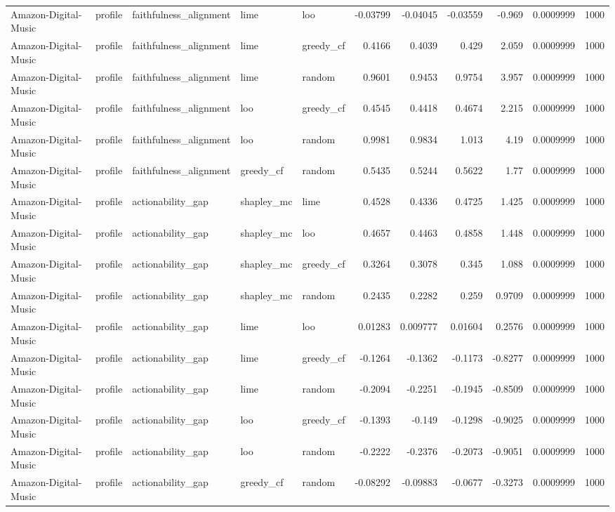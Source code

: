 \begin{table}[t]
\begin{tabular}{lllllrrrrrr}
Amazon-Digital-Music & profile & faithfulness\_alignment & lime & loo & -0.03799 & -0.04045 & -0.03559 & -0.969 & 0.0009999 & 1000 \\
Amazon-Digital-Music & profile & faithfulness\_alignment & lime & greedy\_cf & 0.4166 & 0.4039 & 0.429 & 2.059 & 0.0009999 & 1000 \\
Amazon-Digital-Music & profile & faithfulness\_alignment & lime & random & 0.9601 & 0.9453 & 0.9754 & 3.957 & 0.0009999 & 1000 \\
Amazon-Digital-Music & profile & faithfulness\_alignment & loo & greedy\_cf & 0.4545 & 0.4418 & 0.4674 & 2.215 & 0.0009999 & 1000 \\
Amazon-Digital-Music & profile & faithfulness\_alignment & loo & random & 0.9981 & 0.9834 & 1.013 & 4.19 & 0.0009999 & 1000 \\
Amazon-Digital-Music & profile & faithfulness\_alignment & greedy\_cf & random & 0.5435 & 0.5244 & 0.5622 & 1.77 & 0.0009999 & 1000 \\
Amazon-Digital-Music & profile & actionability\_gap & shapley\_mc & lime & 0.4528 & 0.4336 & 0.4725 & 1.425 & 0.0009999 & 1000 \\
Amazon-Digital-Music & profile & actionability\_gap & shapley\_mc & loo & 0.4657 & 0.4463 & 0.4858 & 1.448 & 0.0009999 & 1000 \\
Amazon-Digital-Music & profile & actionability\_gap & shapley\_mc & greedy\_cf & 0.3264 & 0.3078 & 0.345 & 1.088 & 0.0009999 & 1000 \\
Amazon-Digital-Music & profile & actionability\_gap & shapley\_mc & random & 0.2435 & 0.2282 & 0.259 & 0.9709 & 0.0009999 & 1000 \\
Amazon-Digital-Music & profile & actionability\_gap & lime & loo & 0.01283 & 0.009777 & 0.01604 & 0.2576 & 0.0009999 & 1000 \\
Amazon-Digital-Music & profile & actionability\_gap & lime & greedy\_cf & -0.1264 & -0.1362 & -0.1173 & -0.8277 & 0.0009999 & 1000 \\
Amazon-Digital-Music & profile & actionability\_gap & lime & random & -0.2094 & -0.2251 & -0.1945 & -0.8509 & 0.0009999 & 1000 \\
Amazon-Digital-Music & profile & actionability\_gap & loo & greedy\_cf & -0.1393 & -0.149 & -0.1298 & -0.9025 & 0.0009999 & 1000 \\
Amazon-Digital-Music & profile & actionability\_gap & loo & random & -0.2222 & -0.2376 & -0.2073 & -0.9051 & 0.0009999 & 1000 \\
Amazon-Digital-Music & profile & actionability\_gap & greedy\_cf & random & -0.08292 & -0.09883 & -0.0677 & -0.3273 & 0.0009999 & 1000 \\

\end{tabular}
\end{table}
